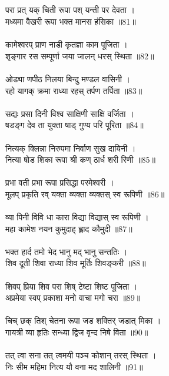 \subsection{}
परा प्रत् यक् चिती रूपा पश् यन्ती पर देवता ।\\
मध्यमा वैखरी रूपा भक्त मानस हंसिका ॥81॥\\
\\
कामेश्वरप् प्राण नाडी कृतज्ञा काम पूजिता ।\\
श‍ृङ्गार रस सम्पूर्णा जया जालन् धरस् स्थिता ॥82॥\\
\\
ओड्या णपीठ निलया बिन्दु मण्डल वासिनी ।\\
रहो यागक् क्रमा राध्या रहस् तर्पण तर्पिता ॥83॥\\
\\
सद्यः प्रसा दिनी विश्व साक्षिणी साक्षि वर्जिता ।\\
षडङ्ग देव ता युक्ता षाड् गुण्य परि पूरिता ॥84॥\\
\\
नित्यक् क्लिन्ना निरुपमा निर्वाण सुख दायिनी ।\\
नित्या षोड शिका रूपा श्री कण् ठार्ध शरी रिणी ॥85॥\\
\\
प्रभा वती प्रभा रूपा प्रसिद्धा परमेश्वरी ।\\
मूलप् प्रकृति रव् यक्ता व्यक्ता व्यक्तस् स्व रूपिणी ॥86॥\\
\\
व्या पिनी विवि धा कारा विद्या विद्यास् स्व रूपिणी ।\\
महा कामेश नयन कुमुदाह् ह्लाद कौमुदी ॥87॥\\
\\
भक्त हार्द तमो भेद भानु मद् भानु सन्ततिः ।\\
शिव दूती शिवा राध्या शिव मूर्तिः शिवङ्करी ॥88॥\\
\\
शिवप् प्रिया शिव परा शिष् टेष्टा शिष्ट पूजिता ।\\
अप्रमेया स्वप् प्रकाशा मनो वाचा मगो चरा ॥89॥\\
\\
चिच् छक् तिश् चेतना रूपा जड शक्तिर् जडात् मिका ।\\
गायत्री व्या हृतिः सन्ध्या द्विज वृन्द निषे विता ॥90॥\\
\\
तत् त्वा सना तत् त्वमयी पञ्च कोशान् तरस् स्थिता ।\\
निः सीम महिमा नित्य यौ वना मद शालिनी ॥91॥\\
\\
